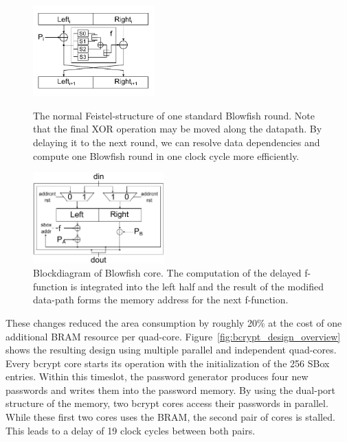 \begin{figure}[tp] \centering
	\begin{minipage}[b]{0.45\textwidth} \centering
		\includegraphics[height=3.5cm]{figures/blowfish_feistel.pdf}
		\caption{The normal Feistel-structure of one standard Blowfish round.
		         Note that the final XOR operation may be moved along the datapath.
				 By delaying it to the next round, we can resolve data
				 dependencies and compute one Blowfish round in one clock
				 cycle more efficiently.}
		\label{fig:blowfish-feistel}
	\end{minipage}%
	\hspace{0.5cm}
	\begin{minipage}[b]{0.45\textwidth} \centering
		\includegraphics[height=3.5cm]{figures/blowfish_core.pdf}
		\caption{Blockdiagram of Blowfish core. The computation of the delayed 
                 f-function is integrated into the left half and the result of
				 the modified data-path forms the memory address for the next f-function.}
		\label{fig:blowfish-core}
	\end{minipage}
\end{figure}

These changes reduced the area consumption by roughly 20\% at the cost of one
additional BRAM resource per quad-core. Figure~\ref{fig:bcrypt_design_overview}
shows the resulting design using multiple parallel and independent quad-cores.
Every bcrypt core starts its operation with the initialization of the 256 SBox
entries. Within this timeslot, the password generator produces four new
passwords and writes them into the password memory. By using the dual-port
structure of the memory, two bcrypt cores access their passwords in parallel.
While these first two cores uses the BRAM, the second pair of cores is stalled.
This leads to a delay of 19 clock cycles between both pairs.

